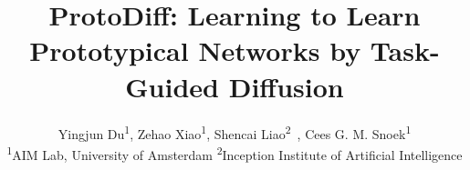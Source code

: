 \documentclass{article}
\title{ProtoDiff: Learning to Learn Prototypical Networks by Task-Guided Diffusion
}
\author{
Yingjun Du\textsuperscript{1},
Zehao Xiao\textsuperscript{1},
Shencai Liao\textsuperscript{2}~,
Cees G. M. Snoek\textsuperscript{1} \\
\textsuperscript{1}AIM Lab, University of Amsterdam \textsuperscript{2}Inception Institute of Artificial Intelligence}
\begin{document}
\maketitle




















\medskip









\newpage	
\appendix


% 
\end{document}
